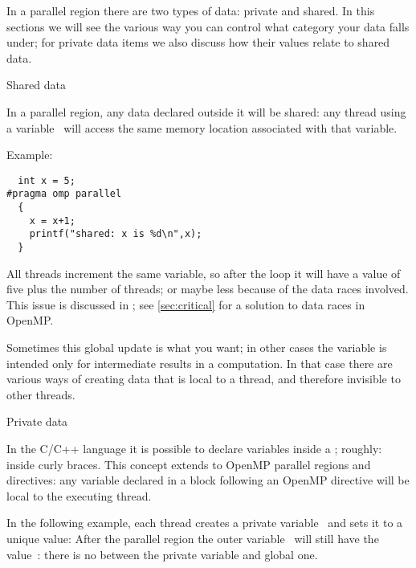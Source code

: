 
\label{sec:ompdata}

In a parallel region there are two types of data: private and shared.
In this sections we will see the various way you can control what category
your data falls under; for private data items we also discuss how their values
relate to shared data.

 {Shared data}

In a parallel region, any data declared outside it will be shared:
any thread using a variable~ will access the same memory location
associated with that variable.

Example:
\begin{lstlisting}
  int x = 5;
#pragma omp parallel
  {
    x = x+1;
    printf("shared: x is %d\n",x);
  }
\end{lstlisting}
All threads increment the same variable, so after the loop it will
have a value of five plus the number of threads;
or maybe less because of the data races involved.
This issue is discussed in ;
see \ref{sec:critical} for a solution to data races in OpenMP.

Sometimes this global update is what you want; in other cases the
variable is intended only for intermediate results in a computation.
In that case 
there are various ways of creating
data that is local to a thread, and therefore invisible to other threads.

 {Private data}
\label{sec:omp-private}

In the C/C++ language it is possible to declare variables inside
a ; roughly: inside curly braces.
This concept extends to OpenMP parallel regions and directives:
any variable declared in a block following an OpenMP directive
will be local to the executing thread.

In the following example, each thread creates a private variable~
and sets it to a unique value:
%
%
After the parallel region the outer variable~ will still have the
value~: there is no  between the
private variable and global one.

